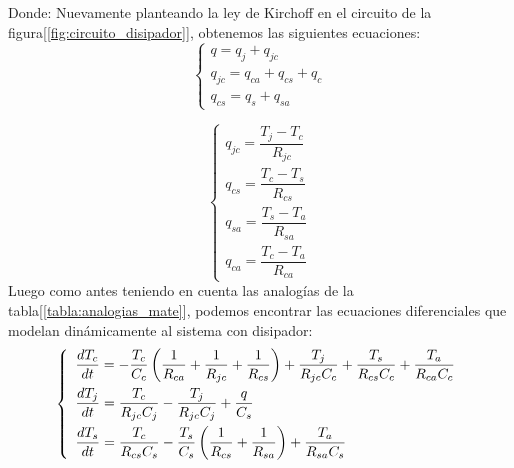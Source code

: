 Donde:
Nuevamente planteando la ley de Kirchoff en el circuito de la figura[\ref{fig:circuito_disipador}], obtenemos las siguientes ecuaciones:
\begin{equation}
\label{eq:nodos_disipador}
   \left\{
      \begin{array}{ll}
         q=q_{j}+q_{jc}\\[10pt]
         q_{jc}=q_{ca}+q_{cs}+q_{c}\\[10pt]
         q_{cs}=q_s+q_{sa}
      \end{array}
   \right.
\end{equation}

\begin{equation}
\label{eq:nodos_disipador2}
   \left\{
      \begin{array}{ll}
         q_{jc}=\dfrac{T_j-T_c}{R_{jc}}\\[10pt]
         q_{cs}=\dfrac{T_c-T_s}{R_{cs}}\\[10pt]
         q_{sa}=\dfrac{T_s-T_a}{R_{sa}}\\[10pt]
         q_{ca}=\dfrac{T_c-T_a}{R_{ca}}
      \end{array}
   \right.
\end{equation}
Luego como antes teniendo en cuenta las analogías de la tabla[\ref{tabla:analogias_mate}], podemos encontrar las ecuaciones diferenciales que modelan dinámicamente
al sistema con disipador:
\begin{equation}
\medskip
\label{eq:diferenciales_disipador}
   \left\{
      \begin{array}{ll}
         \dfrac{dT_{c}}{dt}=-\dfrac{T_{c}}{C_{c}} \left(\dfrac{1}{R_{ca}} + \dfrac{1}{R_{jc}} +\dfrac{1}{R_{cs}}\right) + \dfrac{T_{j}}{R_{jc}C_{c}} + \dfrac{T_{s}}{R_{cs}C_{c}} + \dfrac{T_{a}}{R_{ca}C_{c}} \\[10pt]
         \dfrac{dT_{j}}{dt}=\dfrac{T_{c}}{R_{jc}C_{j}} - \dfrac{T_{j}}{R_{jc}C_{j}} + \dfrac{q}{C_{s}}\\[10pt]
         \dfrac{dT_{s}}{dt}=\dfrac{T_{c}}{R_{cs}C_{s}} - \dfrac{T_{s}}{C_{s}}\left( \dfrac{1}{R_{cs}} + \dfrac{1}{R_{sa}}\right) + \dfrac{T_{a}}{R_{sa}C_{s}}
      \end{array}
   \right.
\end{equation}
